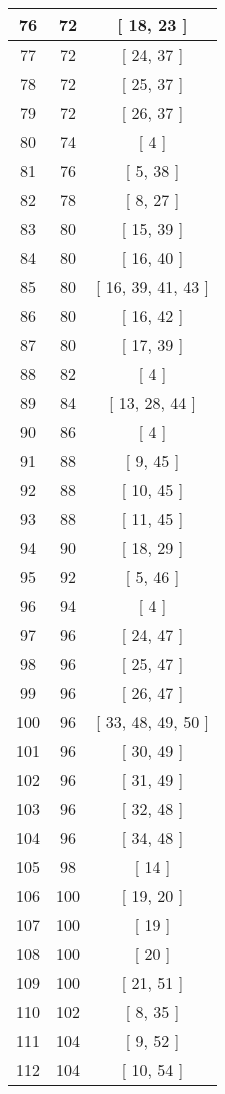 \begin{center}
\begin{longtable}[H]{|| c c c ||}
\\\hline
76 & 72 & [ 18, 23 ]
\\\hline
77 & 72 & [ 24, 37 ]
\\\hline
78 & 72 & [ 25, 37 ]
\\\hline
79 & 72 & [ 26, 37 ]
\\\hline
80 & 74 & [ 4 ]
\\\hline
81 & 76 & [ 5, 38 ]
\\\hline
82 & 78 & [ 8, 27 ]
\\\hline
83 & 80 & [ 15, 39 ]
\\\hline
84 & 80 & [ 16, 40 ]
\\\hline
85 & 80 & [ 16, 39, 41, 43 ]
\\\hline
86 & 80 & [ 16, 42 ]
\\\hline
87 & 80 & [ 17, 39 ]
\\\hline
88 & 82 & [ 4 ]
\\\hline
89 & 84 & [ 13, 28, 44 ]
\\\hline
90 & 86 & [ 4 ]
\\\hline
91 & 88 & [ 9, 45 ]
\\\hline
92 & 88 & [ 10, 45 ]
\\\hline
93 & 88 & [ 11, 45 ]
\\\hline
94 & 90 & [ 18, 29 ]
\\\hline
95 & 92 & [ 5, 46 ]
\\\hline
96 & 94 & [ 4 ]
\\\hline
97 & 96 & [ 24, 47 ]
\\\hline
98 & 96 & [ 25, 47 ]
\\\hline
99 & 96 & [ 26, 47 ]
\\\hline
100 & 96 & [ 33, 48, 49, 50 ]
\\\hline
101 & 96 & [ 30, 49 ]
\\\hline
102 & 96 & [ 31, 49 ]
\\\hline
103 & 96 & [ 32, 48 ]
\\\hline
104 & 96 & [ 34, 48 ]
\\\hline
105 & 98 & [ 14 ]
\\\hline
106 & 100 & [ 19, 20 ]
\\\hline
107 & 100 & [ 19 ]
\\\hline
108 & 100 & [ 20 ]
\\\hline
109 & 100 & [ 21, 51 ]
\\\hline
110 & 102 & [ 8, 35 ]
\\\hline
111 & 104 & [ 9, 52 ]
\\\hline
112 & 104 & [ 10, 54 ]
\\\hline

\end{longtable}
\end{center}
